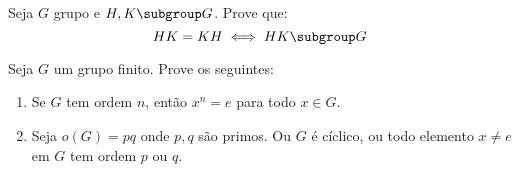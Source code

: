 \begin{exercise}
    Seja $G$ grupo e $H,K \subgroup G$. Prove que:
    $$
        HK = KH \iff HK \subgroup G
    $$
\end{exercise}

\begin{exercise}
    Seja $G$ um grupo finito. Prove os seguintes:
    \begin{enumerate}
        \item Se $G$ tem ordem $n$, então $x^n = e$ para todo $x \in G$.
        \item Seja $o(G) = pq$ onde $p,q$ são primos. Ou $G$ é cíclico, ou todo elemento $x \not = e$ em $G$ tem ordem $p$ ou $q$.
    \end{enumerate}
\end{exercise}
